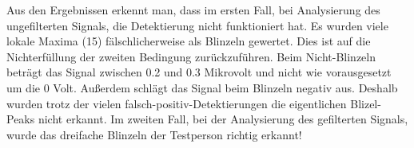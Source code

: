 \documentclass[11pt]{article}
\begin{document}
    Aus den Ergebnissen erkennt man, dass im ersten Fall, bei Analysierung
des ungefilterten Signals, die Detektierung nicht funktioniert hat. Es
wurden viele lokale Maxima (15) fälschlicherweise als Blinzeln gewertet.
Dies ist auf die Nichterfüllung der zweiten Bedingung zurückzuführen.
Beim Nicht-Blinzeln beträgt das Signal zwischen 0.2 und 0.3 Mikrovolt
und nicht wie vorausgesetzt um die 0 Volt. Außerdem schlägt das Signal
beim Blinzeln negativ aus. Deshalb wurden trotz der vielen
falsch-positiv-Detektierungen die eigentlichen Blizel-Peaks nicht
erkannt. Im zweiten Fall, bei der Analysierung des gefilterten Signals,
wurde das dreifache Blinzeln der Testperson richtig erkannt!


    
    
    
    
\end{document}
